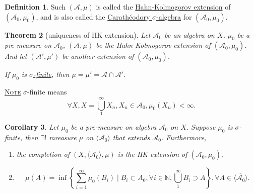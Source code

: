 \documentclass{report}
\newcommand{\N}{\mathbb{N}}
\newcommand{\fancyem}[1]{\underline{\textsc{#1}}}
\newtheorem{theorem}{Theorem}[chapter]
\newtheorem{corollary}[theorem]{Corollary}
\theoremstyle{definition}
\newtheorem{definition}[theorem]{Definition}
\theoremstyle{remark}
\begin{document}
\begin{definition}
Such $(\mathcal{A}, \mu)$ is called the \underline{Hahn-Kolmogorov extension} of $(\mathcal{A}_0, \mu_0)$, and is also called the \underline{Carathéodory $\sigma$-algebra} for $(\mathcal{A}_0, \mu_0)$.
\end{definition}

\begin{theorem}[uniqueness of HK extension]\label{th:hkunique}
Let $\mathcal{A}_0$ be an algebra on $X$, $\mu_0$ be a pre-measure on $\mathcal{A}_0$, $(\mathcal{A}, \mu)$ be the Hahn-Kolmogorov extension of $(\mathcal{A}_0, \mu_0)$.
And let $(\mathcal{A}', \mu')$ be another extension of $(\mathcal{A}_0, \mu_0)$.

If $\mu_0$ is \underline{$\sigma$-finite}, then $\mu = \mu' = \mathcal{A} \cap \mathcal{A}'.$
\end{theorem}

\fancyem{Note} $\sigma$-finite means
\[\forall X, X = \bigcup_1^\infty X_n, X_n \in \mathcal{A}_0, \mu_0(X_n) < \infty.\]

\begin{corollary}
Let $\mu_0$ be a pre-measure on algebra $\mathcal{A}_0$ on $X$. Suppose $\mu_0$ is $\sigma$-finite, then $\exists!$ mreasure $\mu$ on $\langle \mathcal{A}_0 \rangle$ that extends $\mathcal{A}_0$. Furthermore, 
\begin{enumerate}
\item the completion of $(X, \langle \mathcal{A}_0 \rangle, \mu)$ is the HK extension of $(\mathcal{A}_0, \mu_0).$
\item 
\[
\mu(A) = \inf \left\{\sum_{i=1}^\infty \mu_0(B_i) \mid B_i \subset A_0, \forall i \in \N, \bigcup_1^\infty B_i \supset A\right\}, \forall A \in \overline{\langle \mathcal{A}_0\rangle}.
\]
\end{enumerate}
\end{corollary}
\end{document}
